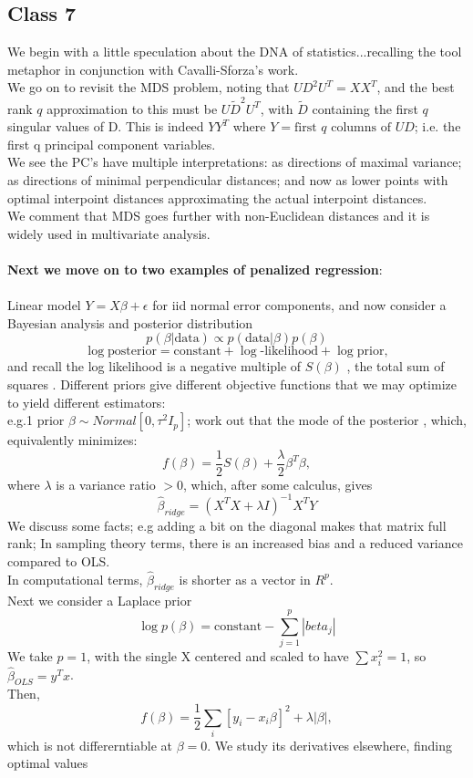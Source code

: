\documentclass[11pt,a4paper]{article}
\begin{document}
\subsection*{Class 7}
We begin with a little speculation about the DNA of statistics...recalling the tool metaphor in conjunction with Cavalli-Sforza's work.\\
We go on to revisit the MDS problem, noting that $U D^2 U^T = X X^T$, and the best rank $q$ approximation to this must be $U \tilde{D}^2 U^T$, with $\tilde{D}$ containing the first $q$ singular values of D.  This is indeed $Y Y^T$ where $Y = \text{first }q\text{ columns of }U D$; i.e. the first q principal component variables.\\
We see the PC's have multiple interpretations:   as directions of maximal variance; as directions of minimal perpendicular distances; and now as lower points with optimal interpoint distances approximating the actual interpoint distances.\\
We comment that MDS goes further with non-Euclidean distances and it is widely used in multivariate analysis.\\\\
\textbf{Next we move on to two examples of penalized regression}:\\\\
Linear model $Y = X \beta + \epsilon$ for iid normal error components, and now consider a Bayesian analysis and posterior distribution
$$p(\beta|\text{data}) \propto p(\text{data}|\beta)  p(\beta)$$
$$\log \text{posterior} = \text{constant} + \log\text{-likelihood} + \log \text{prior},$$
and recall the log likelihood is a negative multiple of $S(\beta)$ , the total sum of squares . Different priors give different objective functions that we may optimize to yield different estimators:\\
e.g.1 $\text{prior }\beta \sim Normal[ 0, \tau^2 I_p ]$;
work out that the mode of the posterior , which, equivalently minimizes:
$$f(\beta) = \frac{1}{2} S(\beta) + \frac{\lambda}{2}\beta^T \beta,$$ where $\lambda$ is a variance ratio $> 0$, which, after some calculus, gives  $$\hat{\beta}_{ridge} = (X^T X + \lambda I )^{-1} X^T Y$$
We discuss some facts; e.g adding a bit on the diagonal makes that matrix full rank; In sampling theory terms, there is an increased bias and a reduced variance compared to OLS.\\
In computational terms, $\hat{\beta}_{ridge}$ is shorter as a vector in $R^p$.\\
Next we consider a Laplace prior $$\log p(\beta) = \text{constant} - \sum_{j=1}^ p | beta_j |$$
We take $p=1$, with the single X centered and scaled to have $\sum x_i^2 = 1$, so $\hat{\beta}_{OLS}= y^T x$.\\
Then, $$f(\beta) = \frac{1}{2} \sum_i[ y_i - x_i \beta ]^2 + \lambda | \beta |,$$  which is not differerntiable at $\beta=0$.  We study its derivatives elsewhere, finding optimal values
\end{document}
